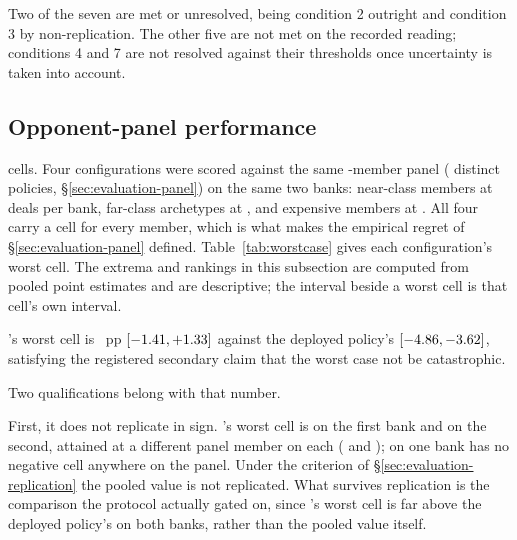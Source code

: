 Two of the seven are met or unresolved, being condition 2 outright and condition 3 by
non-replication. The other five are not met on the recorded reading; conditions 4 and 7 are not
resolved against their thresholds once uncertainty is taken into account.

\subsection{Opponent-panel performance}
\label{sec:results-panel}

\vsevenPanelCells{} cells. Four configurations were scored against the same
\vsevenPanelMembers{}-member panel (\vsevenPanelDistinct{} distinct policies, \S\ref{sec:evaluation-panel})
on the same two banks: \vsevenPanelNear{} near-class members at \vsevenDealsNear{} deals per bank,
\vsevenPanelFar{} far-class archetypes at \vsevenDealsFar{}, and \vsevenPanelExpensive{} expensive
members at \vsevenDealsExpensive{}. All four carry a cell for every member, which is what makes the
empirical regret of \S\ref{sec:evaluation-panel} defined. Table~\ref{tab:worstcase} gives each
configuration's worst cell. The extrema and rankings in this subsection are computed from pooled
point estimates and are descriptive; the interval beside a worst cell is that cell's own interval.

\begin{table}[!ht]\centering
\caption{Worst panel cell per configuration: the panel member against which the configuration's
pooled win-rate edge (percentage points, both banks) is lowest, with that cell's nominal 95\%
interval.
Per-bank values are given in bank order, 7090001 then 7090002.}
\label{tab:worstcase}
{\tabfont}
\end{table}

\sestina{}'s worst cell is \vsevenWorstFrozen{}~pp
$[-1.41, +1.33]$ against the deployed policy's \vsevenWorstIncumbent{}
$[-4.86, -3.62]$, satisfying the registered secondary claim that
the worst case not be catastrophic.

Two qualifications belong with that number.

First, it does not replicate in sign. \sestina{}'s worst cell is
\vsevenWorstFrozenBankOne{} on the first bank and \vsevenWorstFrozenBankTwo{} on the second, attained
at a different panel member on each (\texttt{\vsevenWorstFrozenBankOneOpp{}} and
\texttt{\vsevenWorstFrozenBankTwoOpp{}}); on one bank \sestina{} has no negative cell anywhere on
the panel. Under the criterion of \S\ref{sec:evaluation-replication} the pooled value is not
replicated. What survives replication is the comparison the protocol actually gated on, since
\sestina{}'s worst cell is far above the deployed policy's on both banks, rather than the pooled
value itself.

